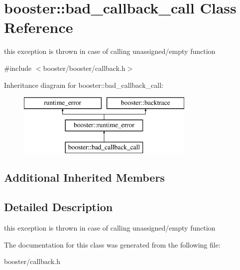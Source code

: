 \section{booster\-:\-:bad\-\_\-callback\-\_\-call Class Reference}
\label{classbooster_1_1bad__callback__call}


this exception is thrown in case of calling unassigned/empty function  




{\ttfamily \#include $<$booster/booster/callback.\-h$>$}

Inheritance diagram for booster\-:\-:bad\-\_\-callback\-\_\-call\-:\begin{figure}[H]
\begin{center}
\leavevmode
\includegraphics[height=3.000000cm]{classbooster_1_1bad__callback__call}
\end{center}
\end{figure}
\subsection*{Additional Inherited Members}


\subsection{Detailed Description}
this exception is thrown in case of calling unassigned/empty function 

The documentation for this class was generated from the following file\-:\begin{DoxyCompactItemize}
\item 
booster/callback.\-h\end{DoxyCompactItemize}
